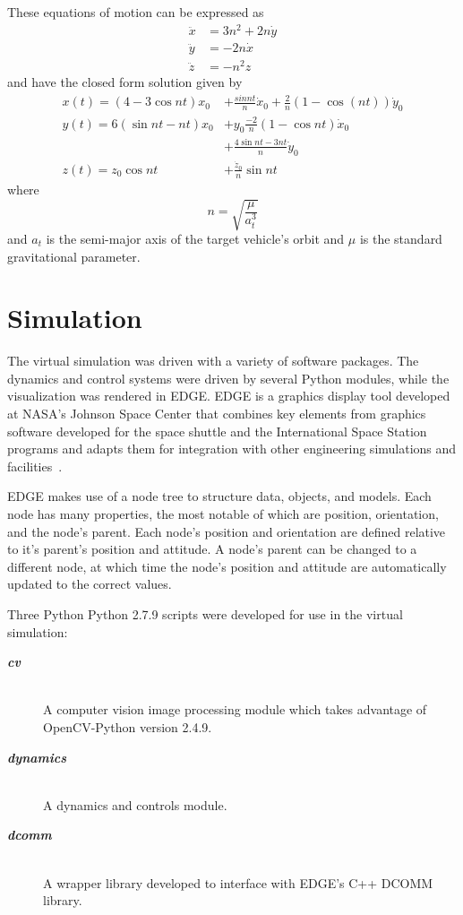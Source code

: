 \documentclass[journal, 10pt]{IEEEtran}
\begin{document}
These equations of motion can be expressed as
\begin{equation}
\begin{split}
\ddot{x} &= 3n^2 + 2n\dot y \\
\ddot{y} &= -2n\dot x \\
\ddot{z} &= -n^2z
\end{split}
\end{equation}
and have the closed form solution given by
\begin{equation}
\begin{split}
x(t) = (4-3 \cos{nt})x_0 &+ \frac{sin{nt}}{n}\dot x_0 + \frac{2}{n} (1 - \cos(nt))\dot y_0\\
y(t) = 6(\sin{nt}-nt)x_0 &+ y_0 \frac{-2}{n}(1 - \cos{nt})\dot x_0 \\
                         &+ \frac{4 \sin{nt} - 3nt}{n}\dot y_0 \\
z(t) = z_0 \cos{nt} &+ \frac{\dot z_0}{n} \sin{nt}
\end{split}
\end{equation}
where
\begin{equation}
n = \sqrt{\frac{\mu}{a^3_t}}
\end{equation}
and $a_t$ is the semi-major axis of the target vehicle's orbit and $\mu$ is the standard gravitational parameter.

\section{Simulation}
The virtual simulation was driven with a variety of software packages. The dynamics and control systems were driven by several Python modules, while the visualization was rendered in EDGE. EDGE is a graphics display tool developed at NASA's Johnson Space Center that combines key elements from graphics software developed for the space shuttle and the International Space Station programs and adapts them for integration with other engineering simulations and facilities~\cite{EDGE}.

EDGE makes use of a node tree to structure data, objects, and models. Each node has many properties, the most notable of which are position, orientation, and the node's parent. Each node's position and orientation are defined relative to it's parent's position and attitude. A node's parent can be changed to a different node, at which time the node's position and attitude are automatically updated to the correct values.

Three Python Python 2.7.9 scripts were developed for use in the virtual simulation:
\begin{description}
    \item[\textbf{\textit{cv}}] \hfill \\
    A computer vision image processing module which takes advantage of OpenCV-Python version 2.4.9.
    \item[\textbf{\textit{dynamics}}] \hfill \\
    A dynamics and controls module.
    \item[\textbf{\textit{dcomm}}] \hfill \\
    A wrapper library developed to interface with EDGE's C++ DCOMM library.
\end{description}
\end{document}
